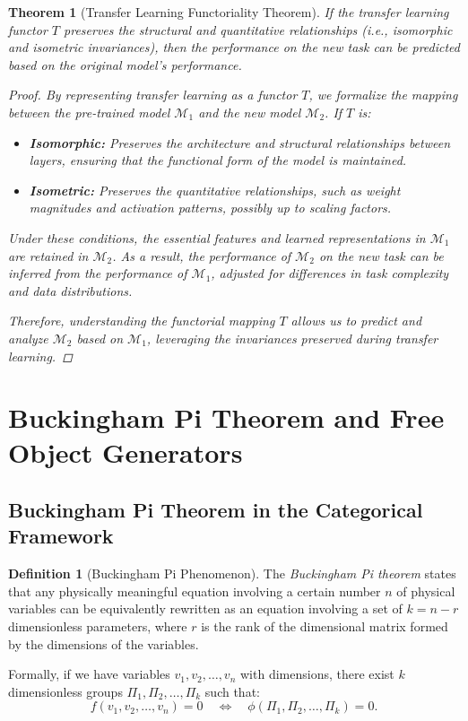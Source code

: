 \documentclass{article}
\newtheorem{theorem}{Theorem}[section]
\theoremstyle{definition}
\newtheorem{definition}{Definition}[section]
\theoremstyle{remark}
\begin{document}
	\begin{theorem}[Transfer Learning Functoriality Theorem]
		If the transfer learning functor $T$ preserves the structural and quantitative relationships (i.e., isomorphic and isometric invariances), then the performance on the new task can be predicted based on the original model's performance.
		
		\begin{proof}
			By representing transfer learning as a functor $T$, we formalize the mapping between the pre-trained model $\mathcal{M}_1$ and the new model $\mathcal{M}_2$. If $T$ is:
			\begin{itemize}
				\item \textbf{Isomorphic:} Preserves the architecture and structural relationships between layers, ensuring that the functional form of the model is maintained.
				\item \textbf{Isometric:} Preserves the quantitative relationships, such as weight magnitudes and activation patterns, possibly up to scaling factors.
			\end{itemize}
			
			Under these conditions, the essential features and learned representations in $\mathcal{M}_1$ are retained in $\mathcal{M}_2$. As a result, the performance of $\mathcal{M}_2$ on the new task can be inferred from the performance of $\mathcal{M}_1$, adjusted for differences in task complexity and data distributions.
			
			Therefore, understanding the functorial mapping $T$ allows us to predict and analyze $\mathcal{M}_2$ based on $\mathcal{M}_1$, leveraging the invariances preserved during transfer learning.
		\end{proof}
	\end{theorem}
	
	\section{Buckingham Pi Theorem and Free Object Generators}
	
	\subsection{Buckingham Pi Theorem in the Categorical Framework}
	
	\begin{definition}[Buckingham Pi Phenomenon]
		The \emph{Buckingham Pi theorem} states that any physically meaningful equation involving a certain number $n$ of physical variables can be equivalently rewritten as an equation involving a set of $k = n - r$ dimensionless parameters, where $r$ is the rank of the dimensional matrix formed by the dimensions of the variables.
		
		Formally, if we have variables $v_1, v_2, \dots, v_n$ with dimensions, there exist $k$ dimensionless groups $\Pi_1, \Pi_2, \dots, \Pi_k$ such that:
		\[
		f(v_1, v_2, \dots, v_n) = 0 \quad \iff \quad \phi(\Pi_1, \Pi_2, \dots, \Pi_k) = 0.
		\]
	\end{definition}
	
\end{document}
